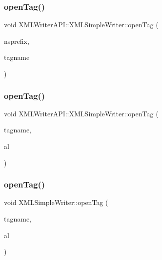 \mbox{\label{classXMLWriterAPI_1_1XMLSimpleWriter_aabef4c9b78d0f9528a0fa0989df1e22e}} 
\subsubsection{\texorpdfstring{openTag()}{openTag()}\hspace{0.1cm}{\footnotesize\ttfamily [6/12]}}
{\footnotesize\ttfamily void X\+M\+L\+Writer\+A\+P\+I\+::\+X\+M\+L\+Simple\+Writer\+::open\+Tag (\begin{DoxyParamCaption}\item[{const std\+::string \&}]{nsprefix,  }\item[{const std\+::string \&}]{tagname }\end{DoxyParamCaption})}

\mbox{\label{classXMLWriterAPI_1_1XMLSimpleWriter_a0cd766e4b96a8c67580c8b304faced84}} 
\subsubsection{\texorpdfstring{openTag()}{openTag()}\hspace{0.1cm}{\footnotesize\ttfamily [7/12]}}
{\footnotesize\ttfamily void X\+M\+L\+Writer\+A\+P\+I\+::\+X\+M\+L\+Simple\+Writer\+::open\+Tag (\begin{DoxyParamCaption}\item[{const std\+::string \&}]{tagname,  }\item[{\mbox{\hyperlink{namespaceXMLWriterAPI_a28cf3d8051a4ccf0aef208b7ebc66d07}{Attribute\+List}} \&}]{al }\end{DoxyParamCaption})}

\mbox{\label{classXMLWriterAPI_1_1XMLSimpleWriter_ae196789031d10e7157fcdb131452d82a}} 
\subsubsection{\texorpdfstring{openTag()}{openTag()}\hspace{0.1cm}{\footnotesize\ttfamily [8/12]}}
{\footnotesize\ttfamily void X\+M\+L\+Simple\+Writer\+::open\+Tag (\begin{DoxyParamCaption}\item[{const std\+::string \&}]{tagname,  }\item[{\mbox{\hyperlink{namespaceXMLWriterAPI_a28cf3d8051a4ccf0aef208b7ebc66d07}{Attribute\+List}} \&}]{al }\end{DoxyParamCaption})}

